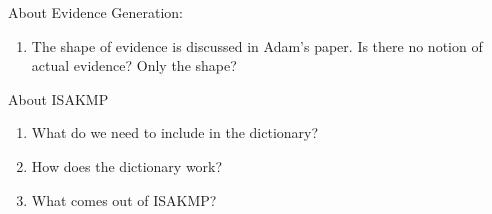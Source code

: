 \documentclass[10pt]{report}
\begin{document}
About Evidence Generation:

\begin{enumerate}
  \item The shape of evidence is discussed in Adam's paper. 
		Is there no notion of actual evidence? Only the shape?
\end{enumerate}

About ISAKMP

\begin{enumerate}
\item What do we need to include in the dictionary?
\item How does the dictionary work?
\item What comes out of ISAKMP?

\end{enumerate}
\end{document}
